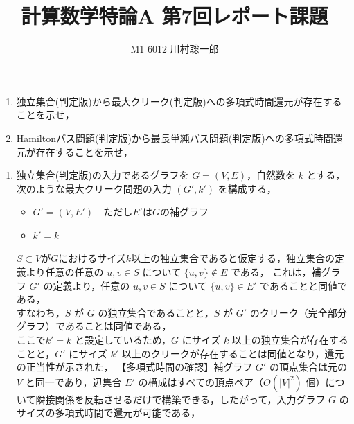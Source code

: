 \documentclass[dvipdfmx]{jsreport}
\title{計算数学特論A 第7回レポート課題}
\author{M1 6012 川村聡一郎}
\date{}
\begin{document}
\maketitle

\begin{tcolorbox}
\begin{enumerate}
	\item 独立集合(判定版)から最大クリーク(判定版)への多項式時間還元が存在することを示せ，
	\item Hamiltonパス問題(判定版)から最長単純パス問題(判定版)への多項式時間還元が存在することを示せ，
\end{enumerate}
\end{tcolorbox}

\begin{souanswer} %
\begin{enumerate}
	\item 独立集合(判定版)の入力であるグラフを $G=(V, E)$，自然数を $k$ とする，
	次のような最大クリーク問題の入力 $(G', k')$ を構成する，
\begin{itemize}
	\item $G'= (V, E')$\ \ ただし$E'$は$G$の補グラフ
	\item $k'= k$
\end{itemize}
	$S\subset V$が$G$におけるサイズ$k$以上の独立集合であると仮定する，独立集合の定義より任意の任意の $u, v \in S$ について $\{u, v\} \notin E$ である，
	これは，補グラフ $G'$ の定義より，任意の $u, v \in S$ について $\{u, v\} \in E'$ であることと同値である，\\
	すなわち，$S$ が $G$ の独立集合であることと，$S$ が $G'$ のクリーク（完全部分グラフ）であることは同値である，\\
	ここで$k' = k$ と設定しているため，$G$ にサイズ $k$ 以上の独立集合が存在することと，$G'$ にサイズ $k'$ 以上のクリークが存在することは同値となり，還元の正当性が示された，  【多項式時間の確認】補グラフ $G'$ の頂点集合は元の $V$ と同一であり，辺集合 $E'$ の構成はすべての頂点ペア（$O(|V|^2)$ 個）について隣接関係を反転させるだけで構築できる，したがって，入力グラフ $G$ のサイズの多項式時間で還元が可能である，


\end{enumerate}
\end{souanswer}
\end{document}
